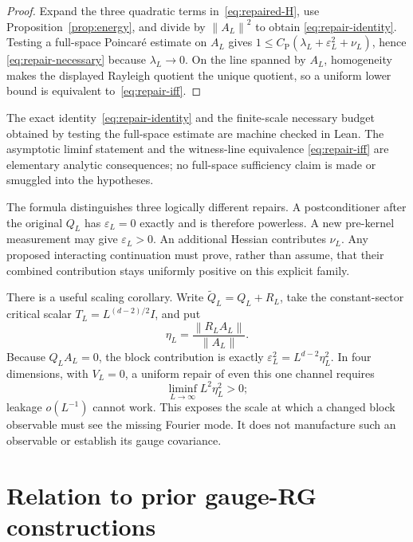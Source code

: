 \documentclass[11pt]{article}
\theoremstyle{definition}
\newcommand{\CP}{C_{\mathrm P}}
\newcommand{\norm}[1]{\left\lVert #1\right\rVert}
\begin{document}
\begin{proof}
Expand the three quadratic terms in~\eqref{eq:repaired-H}, use
Proposition~\ref{prop:energy}, and divide by $\norm{A_L}^2$ to obtain
\eqref{eq:repair-identity}.  Testing a full-space Poincar\'e estimate on
$A_L$ gives $1\le\CP(\lambda_L+\varepsilon_L^2+\nu_L)$, hence
\eqref{eq:repair-necessary} because $\lambda_L\to0$.  On the line spanned by
$A_L$, homogeneity makes the displayed Rayleigh quotient the unique quotient,
so a uniform lower bound is equivalent to~\eqref{eq:repair-iff}.
\end{proof}

The exact identity~\eqref{eq:repair-identity} and the finite-scale necessary
budget obtained by testing the full-space estimate are machine checked in
Lean.  The asymptotic liminf statement and the witness-line equivalence
\eqref{eq:repair-iff} are elementary analytic consequences; no full-space
sufficiency claim is made or smuggled into the hypotheses.

The formula distinguishes three logically different repairs.  A
postconditioner after the original $Q_L$ has $\varepsilon_L=0$ exactly and is
therefore powerless.  A new pre-kernel measurement may give
$\varepsilon_L>0$.  An additional Hessian contributes $\nu_L$.  Any proposed
interacting continuation must prove, rather than assume, that their combined
contribution stays uniformly positive on this explicit family.

There is a useful scaling corollary.  Write
$\widetilde Q_L=Q_L+R_L$, take the constant-sector critical scalar
$T_L=L^{(d-2)/2}I$, and put
\begin{equation}\label{eq:leakage}
 \eta_L=\frac{\norm{R_LA_L}}{\norm{A_L}}.
\end{equation}
Because $Q_LA_L=0$, the block contribution is exactly
$\varepsilon_L^2=L^{d-2}\eta_L^2$.  In four dimensions, with $V_L=0$, a
uniform repair of even this one channel requires
\begin{equation}\label{eq:d4-leakage}
 \liminf_{L\to\infty}L^2\eta_L^2>0;
\end{equation}
leakage $o(L^{-1})$ cannot work.  This exposes the scale at which a changed
block observable must see the missing Fourier mode.  It does not manufacture
such an observable or establish its gauge covariance.

\section{Relation to prior gauge-RG constructions}
\end{document}
